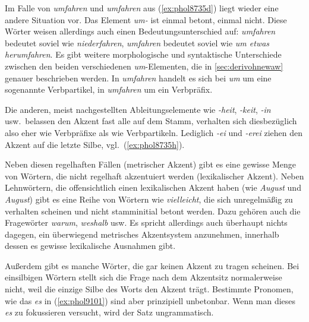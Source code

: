 Im Falle von \textit{\Akz umfahren} und \textit{um\Akz fahren} aus (\ref{ex:phol8735d}) liegt wieder eine andere Situation vor.
Das Element \textit{um-} ist einmal betont, einmal nicht.
Diese Wörter weisen allerdings auch einen Bedeutungsunterschied auf:
\textit{\Akz umfahren} bedeutet soviel wie \textit{niederfahren}, \textit{um\Akz fahren} bedeutet soviel wie \textit{um etwas herumfahren}.
Es gibt weitere morphologische und syntaktische Unterschiede zwischen den beiden verschiedenen \textit{um}-Elementen, die in \ref{sec:derivohnewaw} genauer beschrieben werden.
In \textit{\Akz umfahren} handelt es sich bei \textit{um} um eine sogenannte Verbpartikel, in \textit{um\Akz fahren} um ein Verbpräfix.


Die anderen, meist nachgestellten Ableitungselemente wie \textit{-heit}, \textit{-keit}, \textit{-in} usw.\ belassen den Akzent fast alle auf dem Stamm, verhalten sich diesbezüglich also eher wie Verbpräfixe als wie Verbpartikeln.
Lediglich \textit{-ei} und \textit{-erei} ziehen den Akzent auf die letzte Silbe, vgl.\ (\ref{ex:phol8735h}).

Neben diesen regelhaften Fällen (metrischer Akzent) gibt es eine gewisse Menge von Wörtern, die nicht regelhaft akzentuiert werden (lexikalischer Akzent).
Neben Lehnwörtern, die offensichtlich einen lexikalischen Akzent haben (wie \textit{\Akz August} und \textit{Au\Akz gust}) gibt es eine Reihe von Wörtern wie \textit{vie\Akz lleicht}, die sich unregelmäßig zu verhalten scheinen und nicht stamminitial betont werden.
Dazu gehören auch die Fragewörter \textit{wa\Akz rum}, \textit{wes\Akz halb} usw.
Es spricht allerdings auch überhaupt nichts dagegen, ein überwiegend metrisches Akzentsystem anzunehmen, innerhalb dessen es gewisse lexikalische Ausnahmen gibt.

Außerdem gibt es manche Wörter, die gar keinen Akzent zu tragen scheinen.
Bei einsilbigen Wörtern stellt sich die Frage nach dem Akzentsitz normalerweise nicht, weil die einzige Silbe des Worts den Akzent trägt.
Bestimmte Pronomen, wie das \textit{es} in (\ref{ex:phol9101}) sind aber prinzipiell unbetonbar.
Wenn man dieses \textit{es} zu fokussieren versucht, wird der Satz ungrammatisch.

\begin{exe}
  \ex\label{ex:phol9101}
  \begin{xlist}
  \end{xlist}
\end{exe}

